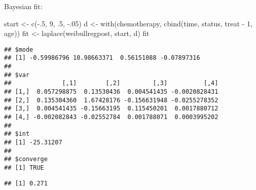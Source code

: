 \documentclass[
]{book}
\newenvironment{Shaded}{\begin{snugshade}}{\end{snugshade}}
\newcommand{\AttributeTok}[1]{\textcolor[rgb]{0.77,0.63,0.00}{#1}}
\newcommand{\DecValTok}[1]{\textcolor[rgb]{0.00,0.00,0.81}{#1}}
\newcommand{\FloatTok}[1]{\textcolor[rgb]{0.00,0.00,0.81}{#1}}
\newcommand{\FunctionTok}[1]{\textcolor[rgb]{0.00,0.00,0.00}{#1}}
\newcommand{\NormalTok}[1]{#1}
\newcommand{\OtherTok}[1]{\textcolor[rgb]{0.56,0.35,0.01}{#1}}
\newcommand{\SpecialCharTok}[1]{\textcolor[rgb]{0.00,0.00,0.00}{#1}}
\begin{document}
Bayesian fit:

\begin{Shaded}
\begin{Highlighting}[]
\NormalTok{start }\OtherTok{\textless{}{-}} \FunctionTok{c}\NormalTok{(}\SpecialCharTok{{-}}\NormalTok{.}\DecValTok{5}\NormalTok{, }\DecValTok{9}\NormalTok{, .}\DecValTok{5}\NormalTok{, }\SpecialCharTok{{-}}\NormalTok{.}\DecValTok{05}\NormalTok{)}
\NormalTok{d }\OtherTok{\textless{}{-}} \FunctionTok{with}\NormalTok{(chemotherapy,}
          \FunctionTok{cbind}\NormalTok{(time, status, treat }\SpecialCharTok{{-}} \DecValTok{1}\NormalTok{, age))}
\NormalTok{fit }\OtherTok{\textless{}{-}} \FunctionTok{laplace}\NormalTok{(weibullregpost, start, d)}
\NormalTok{fit}
\end{Highlighting}
\end{Shaded}

\begin{verbatim}
## $mode
## [1] -0.59986796 10.98663371  0.56151088 -0.07897316
## 
## $var
##              [,1]        [,2]         [,3]          [,4]
## [1,]  0.057298875  0.13530436  0.004541435 -0.0020828431
## [2,]  0.135304360  1.67428176 -0.156631948 -0.0255278352
## [3,]  0.004541435 -0.15663195  0.115450201  0.0017880712
## [4,] -0.002082843 -0.02552784  0.001788071  0.0003995202
## 
## $int
## [1] -25.31207
## 
## $converge
## [1] TRUE
\end{verbatim}

\begin{Shaded}
\end{Shaded}

\begin{verbatim}
## [1] 0.271
\end{verbatim}
\end{document}
